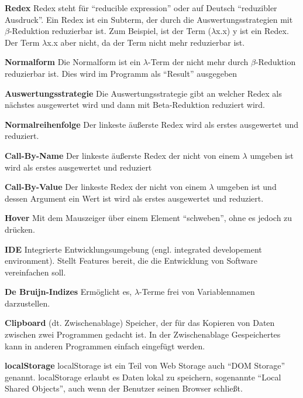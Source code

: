 \documentclass[parskip=full,11pt,twoside]{scrartcl}
\begin{document}
\textbf {Redex}
\newline
Redex steht für \enquote{reducible expression} oder auf Deutsch \enquote{reduzibler Ausdruck}. Ein Redex ist ein Subterm, der durch die Auswertungsstrategien mit $\beta$-Reduktion reduzierbar ist.
\newline
Zum Beispiel, ist der Term ($\lambda$x.x) y ist ein Redex. Der Term $\lambda$x.x aber nicht, da der Term nicht mehr reduzierbar ist.

\textbf{Normalform}
\newline
Die Normalform ist ein $\lambda$-Term der nicht mehr durch $\beta$-Reduktion reduzierbar ist. Dies wird im Programm als \enquote{Result} ausgegeben

\textbf{Auswertungsstrategie}
\newline
Die Auswertungsstrategie gibt an welcher Redex als nächstes ausgewertet wird und dann mit Beta-Reduktion reduziert wird.

\textbf{Normalreihenfolge}
\newline
Der linkeste äußerste Redex wird als erstes ausgewertet und reduziert.

\textbf{Call-By-Name}
\newline
Der linkeste äußerste Redex der nicht von einem $\lambda$ umgeben ist wird als erstes ausgewertet und reduziert

\textbf{Call-By-Value}
\newline
Der linkeste Redex der nicht von einem $\lambda$ umgeben ist und dessen Argument ein Wert ist wird als erstes ausgewertet und reduziert.

\textbf{Hover}
\newline
Mit dem Mauszeiger über einem Element \enquote{schweben}, ohne es jedoch zu drücken.

\textbf{IDE}
\newline
Integrierte Entwicklungsumgebung (engl. integrated developement environment). Stellt Features bereit, die die Entwicklung von Software vereinfachen soll.

\textbf{De Bruijn-Indizes}
\newline
Ermöglicht es, $\lambda$-Terme frei von Variablennamen darzustellen.

\textbf{Clipboard}
\newline
(dt. Zwischenablage) Speicher, der für das Kopieren von Daten zwischen zwei Programmen gedacht ist. In der Zwischenablage Gespeichertes kann in anderen Programmen einfach eingefügt werden.

\textbf{localStorage}
\newline
localStorage ist ein Teil von Web Storage auch \enquote{DOM Storage} genannt. localStorage erlaubt es Daten lokal zu speichern, sogenannte \enquote{Local Shared Objects}, auch wenn der Benutzer seinen Browser schließt.
\end{document}
